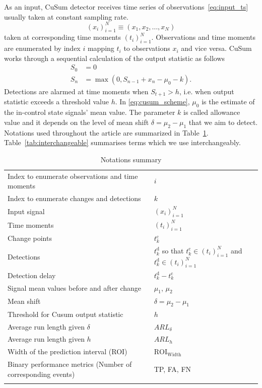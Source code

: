 As an input, CuSum detector receives time series of observations~\ref{eq:input_ts} usually taken at constant sampling rate.
\begin{equation}\label{eq:input_ts}
	(x_i)_{i=1}^{N} \equiv (x_1, x_2, \dots, x_N)
\end{equation}
taken at corresponding time moments $(t_i)_{i=1}^N$.
Observations and time moments are enumerated by index $i$ mapping $t_i$ to observations $x_i$ and vice versa.
CuSum works through a sequential calculation of the output statistic as follows
\begin{align}
	S_0 &= 0 \nonumber \\
	S_{n} &= \max (0, S_{n-1} + x_n - \mu_0 - k )\label{eq:cusum_scheme}.
\end{align}
Detections are alarmed at time moments when $S_{t+1} > h$, i.e. when output statistic exceeds a threshold value $h$.
In \eqref{eq:cusum_scheme}, $\mu_0$ is the estimate of the in-control state signals' mean value.
The parameter $k$ is called allowance value and it depends on the level of mean shift $\delta=\mu_2-\mu_1$ that we aim to detect.
Notations used throughout the article are summarized in Table~\ref{tab:notations}. Table~\ref{tab:interchangeable} summarises terms which we use interchangeably.
\begin{table}[!htb]
	\begin{tabular}{|l|l|}
		\hline\noalign{\smallskip}
		Index to enumerate observations and time moments & $i$ \\
		Index to enumerate changes and detections & $k$ \\
		Input signal & $(x_i)_{i=1}^{N} $ \\
		Time moments & $(t_i)_{i=1}^{N}$ \\
    Change points & $t_{k}^{\text{c}}$ \\
		Detections & $t_{k}^{\text{d}}$ so that  $t_{k}^{\text{c}} \in (t_i)_{i=1}^{N}$ and  $t_{k}^{\text{d}} \in (t_i)_{i=1}^{N}$   \\
		Detection delay & $t_k^{\text{d}} - t_k^{\text{c}}$ \\
		Signal mean values before and after change& $\mu_1$, $\mu_2$ \\
		Mean shift & $\delta=\mu_2 - \mu_1$   \\
		Threshold for Cusum output statistic & $h$  \\
		Average run length given $\delta$ & $ARL_{\delta}$ \\
		Average run length given $h$ & $ARL_{h}$ \\
		Width of the prediction interval (ROI) & $\text{ROI}_{\text{Width}}$  \\
    Binary performance metrics (Number of corresponding events) & TP, FA, FN \\
		\noalign{\smallskip}\hline
	\end{tabular}
	\caption{Notations summary}~\label{tab:notations}
\end{table}
